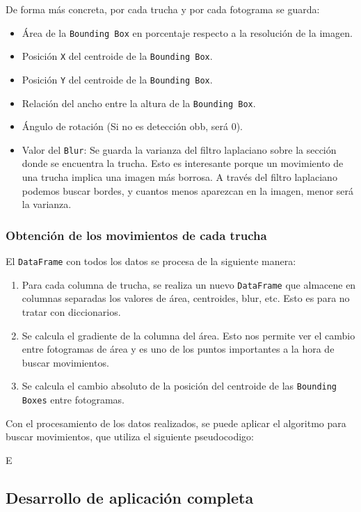 \clearpage

De forma más concreta, por cada trucha y por cada fotograma se guarda:
\begin{itemize}
    \item Área de la \texttt{Bounding Box} en porcentaje respecto a la resolución de la imagen.
    \item Posición \texttt{X} del centroide de la \texttt{Bounding Box}.
    \item Posición \texttt{Y} del centroide de la \texttt{Bounding Box}.
    \item Relación del ancho entre la altura de la \texttt{Bounding Box}.
    \item Ángulo de rotación (Si no es detección \acrshort{obb}, será 0).
    \item Valor del \texttt{Blur}: Se guarda la varianza del filtro laplaciano sobre la sección donde se encuentra la trucha. Esto es interesante porque un movimiento de una trucha implica una imagen más borrosa. A través 
    del filtro laplaciano podemos buscar bordes, y cuantos menos aparezcan en la imagen, menor será la varianza.
\end{itemize}

\subsubsection{Obtención de los movimientos de cada trucha}

El \texttt{DataFrame} con todos los datos se procesa de la siguiente manera:
\begin{enumerate}
    \item Para cada columna de trucha, se realiza un nuevo \texttt{DataFrame} que almacene en columnas separadas los valores de área, centroides, blur, etc. Esto es para no tratar con diccionarios.
    \item Se calcula el gradiente de la columna del área. Esto nos permite ver el cambio entre fotogramas de área y es uno de los puntos importantes a la hora de buscar movimientos.
    \item Se calcula el cambio absoluto de la posición del centroide de las \texttt{Bounding Boxes} entre fotogramas.
\end{enumerate}

Con el procesamiento de los datos realizados, se puede aplicar el algoritmo para buscar movimientos, que utiliza el siguiente pseudocodigo:


E

\clearpage
\subsection{Desarrollo de aplicación completa}